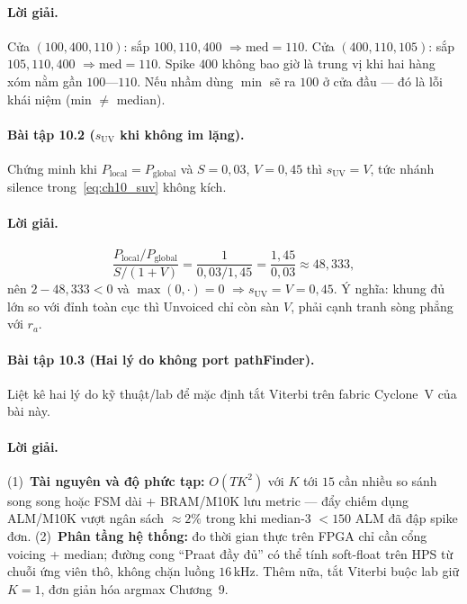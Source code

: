 \paragraph{Lời giải.} Cửa $(100,400,110)$: sắp $100,110,400$ $\Rightarrow\mathrm{med}=110$. Cửa $(400,110,105)$: sắp $105,110,400$ $\Rightarrow\mathrm{med}=110$. Spike $400$ không bao giờ là trung vị khi hai hàng xóm nằm gần $100$---$110$. Nếu nhầm dùng $\min$ sẽ ra $100$ ở cửa đầu --- đó là lỗi khái niệm (min $\neq$ median).

\paragraph{Bài tập 10.2 ($s_{\mathrm{UV}}$ khi không im lặng).}
Chứng minh khi $P_{\mathrm{local}}=P_{\mathrm{global}}$ và $S=0{,}03$, $V=0{,}45$ thì $s_{\mathrm{UV}}=V$, tức nhánh silence trong~\eqref{eq:ch10_suv} không kích.

\paragraph{Lời giải.}
\[
\frac{P_{\mathrm{local}}/P_{\mathrm{global}}}{S/(1+V)}=\frac{1}{0{,}03/1{,}45}=\frac{1{,}45}{0{,}03}\approx 48{,}333,
\]
nên $2-48{,}333<0$ và $\max(0,\cdot)=0$ $\Rightarrow s_{\mathrm{UV}}=V=0{,}45$. Ý nghĩa: khung đủ lớn so với đỉnh toàn cục thì Unvoiced chỉ còn sàn $V$, phải cạnh tranh sòng phẳng với $r_a$.

\paragraph{Bài tập 10.3 (Hai lý do không port pathFinder).}
Liệt kê hai lý do kỹ thuật/lab để mặc định tắt Viterbi trên fabric Cyclone~V của bài này.

\paragraph{Lời giải.} (1)~\textbf{Tài nguyên và độ phức tạp:} $O(TK^2)$ với $K$ tới $15$ cần nhiều so sánh song song hoặc FSM dài + BRAM/M10K lưu metric --- đẩy chiếm dụng ALM/M10K vượt ngân sách $\approx 2\%$ trong khi median-3 $<150$ ALM đã đập spike đơn. (2)~\textbf{Phân tầng hệ thống:} đo thời gian thực trên FPGA chỉ cần cổng voicing + median; đường cong ``Praat đầy đủ'' có thể tính soft-float trên HPS từ chuỗi ứng viên thô, không chặn luồng $16\,\text{kHz}$. Thêm nữa, tắt Viterbi buộc lab giữ $K{=}1$, đơn giản hóa argmax Chương~9.
